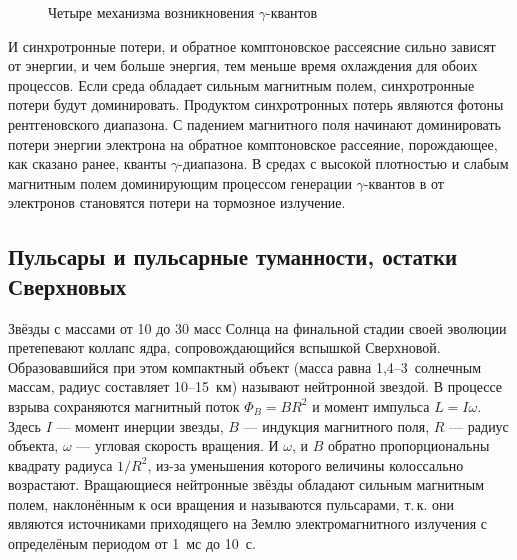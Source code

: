 \documentclass[magd,floatypics,numeref]{msudipl} %
\begin{document}
\begin{figure}[th]
	\noindent{}
	\caption{Четыре механизма возникновения $\gamma$-квантов}
	\label{pic:four_mechanisms}
\end{figure}

И синхротронные потери, и обратное комптоновское рассеясние сильно зависят от энергии, и чем больше энергия, тем меньше время охлаждения для обоих процессов.  Если среда обладает сильным магнитным полем, синхротронные потери будут доминировать. Продуктом синхротронных потерь являются фотоны рентгеновского диапазона. С падением магнитного поля начинают доминировать потери энергии электрона на обратное комптоновское рассеяние, порождающее, как сказано ранее, кванты $\gamma$-диапазона. 
В средах с высокой плотностью и слабым магнитным полем доминирующим процессом генерации $\gamma$-квантов в от электронов становятся потери на тормозное излучение. 
\subsection{Пульсары и пульсарные туманности, остатки Сверхновых}
Звёзды с массами от 10 до 30 масс Солнца на финальной стадии своей эволюции претепевают коллапс ядра, сопровождающийся вспышкой Сверхновой. Образовавшийся при этом компактный объект (масса равна 1,4--3~солнечным массам, радиус составляет 10--15~км) называют нейтронной звездой. В процессе взрыва сохраняются магнитный поток $\Phi_B=BR^2$ и момент импульса $L = I\omega$. Здесь $I$ --- момент инерции звезды, $B$ --- индукция магнитного поля, $R$ --- радиус объекта, $\omega$ --- угловая скорость вращения. И $\omega$, и $B$ обратно пропорциональны квадрату радиуса $1/R^2$, из-за уменьшения которого  величины колоссально возрастают. Вращающиеся нейтронные звёзды обладают сильным магнитным полем, наклонённым к оси вращения и называются пульсарами, т.\,к. они являются источниками приходящего на Землю электромагнитного излучения с определёным периодом от 1~мс до 10~с. 
\end{document}
